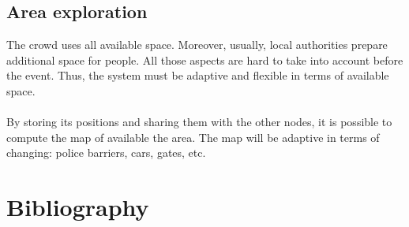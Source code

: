 \documentclass[12pt,a4paper]{report}
\begin{document}
\section*{Area exploration}
The crowd uses all available space. Moreover, usually, local authorities prepare additional space for people. All those aspects are hard to take into account before the event. Thus, the system must be adaptive and flexible in terms of available space. \\\\
By storing its positions and sharing them with the other nodes, it is possible to compute the map of available the area. The map will be adaptive in terms of changing: police barriers, cars, gates, etc.












\chapter*{Bibliography}
\end{document}
